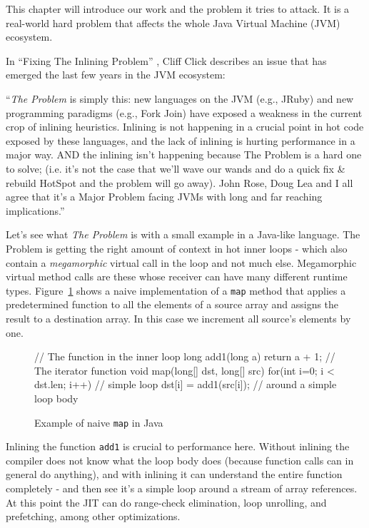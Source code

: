 \label{introduction}
This chapter will introduce our work and the problem it tries to attack. It is a
real-world hard problem that affects the whole Java Virtual Machine (JVM) 
ecosystem.

In ``Fixing The Inlining Problem'' , Cliff Click describes an issue
that has emerged the last few years in the JVM ecosystem:

``\emph{The Problem} is simply this: new languages on the JVM (e.g., JRuby) and new
programming paradigms (e.g., Fork Join) have exposed a weakness in the current
crop of inlining heuristics.  Inlining is not happening in a crucial point in
hot code exposed by these languages, and the lack of inlining is hurting
performance in a major way.  AND the inlining isn't happening because The
Problem is a hard one to solve; (i.e. it's not the case that we'll wave our
wands and do a quick fix \& rebuild HotSpot and the problem will go away).  
John Rose, Doug Lea and I all agree that it's a Major Problem facing JVMs with long
and far reaching implications.''

Let's see what \emph{The Problem} is with a small example in a Java-like language. The
Problem is getting the right amount of context in hot inner loops - which also
contain a \emph{megamorphic} virtual call in the loop and not much else. Megamorphic virtual method calls are these whose receiver can have many different runtime types. Figure~\ref{java_naive_map} 
shows a naive implementation of a \texttt{map} method that applies a predetermined
function to all the elements of a source array and assigns the result to a
destination array. In this case we increment all source's elements by one.

\begin{figure}
\begin{javaCode}
// The function in the inner loop
long add1(long a) {return a + 1;}
// The iterator function
void map(long[] dst, long[] src) {
  for(int i=0; i < dst.len; i++) // simple loop
    dst[i] = add1(src[i]); // around a simple loop body
}
\end{javaCode}
\caption[Example of naive \texttt{map} in Java]{Example of naive \texttt{map} in Java}
\label{java_naive_map}
\end{figure}

Inlining the function \texttt{add1} is crucial to performance here.  Without
inlining the compiler does not know what the loop body does (because function
calls can in general do anything), and with inlining it can understand the
entire function completely - and then see it's a simple loop around a stream of
array references.  At this point the JIT can do range-check elimination, loop
unrolling, and prefetching, among other optimizations.

